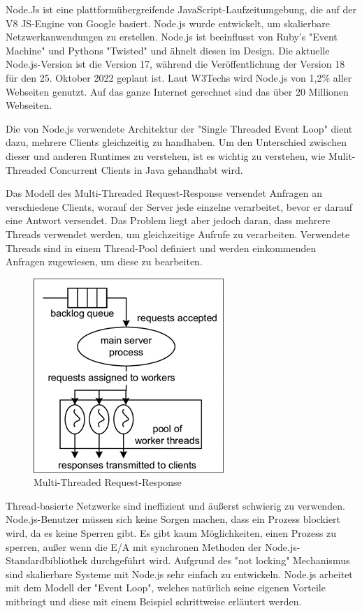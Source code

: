 Node.Js ist eine plattformübergreifende JavaScript-Laufzeitumgebung, die auf der V8 JS-Engine von Google basiert. Node.js wurde entwickelt, um skalierbare Netzwerkanwendungen zu erstellen. Node.js ist beeinflusst von Ruby's "Event Machine" und Pythons "Twisted" und ähnelt diesen im Design. Die aktuelle Node.js-Version ist die Version 17, während die Veröffentlichung der Version 18 für den 25. Oktober 2022 geplant ist. Laut W3Techs wird Node.js von 1,2\% aller Webseiten genutzt. Auf das ganze Internet gerechnet sind das über 20 Millionen Webseiten. \cite{Node}

Die von Node.js verwendete Architektur der "Single Threaded Event Loop" dient dazu, mehrere Clients gleichzeitig zu handhaben. Um den Unterschied zwischen dieser und anderen Runtimes zu verstehen, ist es wichtig zu verstehen, wie Mulit-Threaded Concurrent Clients in Java gehandhabt wird. \cite{NodeJs.dev}


Das Modell des Multi-Threaded Request-Response versendet Anfragen an verschiedene Clients, worauf der Server jede einzelne verarbeitet, bevor er darauf eine Antwort versendet. Das Problem liegt aber jedoch daran, dass mehrere Threads verwendet werden, um gleichzeitige Aufrufe zu verarbeiten. Verwendete Threads sind in einem Thread-Pool definiert und werden einkommenden Anfragen zugewiesen, um diese zu bearbeiten. \cite{Arocom}



\begin{figure}[H]
    \centering
    \includegraphics{media/NodeJs/MultiThreadedRequestResponse.png}
    \caption{Multi-Threaded Request-Response}
\end{figure}

Thread-basierte Netzwerke sind ineffizient und äußerst schwierig zu verwenden. Node.js-Benutzer müssen sich keine Sorgen machen, dass ein Prozess blockiert wird, da es keine Sperren gibt. Es gibt kaum Möglichkeiten, einen Prozess zu sperren, außer wenn die E/A mit synchronen Methoden der Node.js-Standardbibliothek durchgeführt wird. Aufgrund des "not locking" Mechanismus sind skalierbare Systeme mit Node.js sehr einfach zu entwickeln. 
Node.js arbeitet mit dem Modell der "Event Loop", welches natürlich seine eigenen Vorteile mitbringt und diese mit einem Beispiel schrittweise erläutert werden.


